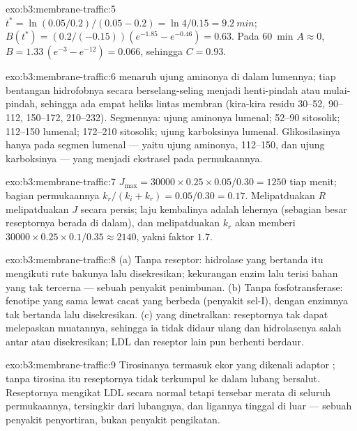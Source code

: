 \begin{solution}{exo:b3:membrane-traffic:5}
$t^{*} = \ln(0.05/0.2)/(0.05 - 0.2) = \ln 4/0.15 = \qty{9.2}{min}$;
$B(t^{*}) = (0.2/(-0.15))(e^{-1.85} - e^{-0.46}) = 0.63$. Pada \qty{60}{min}
$A \approx 0$, $B = 1.33\,(e^{-3} - e^{-12}) = 0.066$, sehingga $C = 0.93$.
\end{solution}

\begin{solution}{exo:b3:membrane-traffic:6}
 menaruh ujung aminonya di dalam lumennya; tiap
bentangan hidrofobnya secara berselang-seling menjadi henti-pindah atau
mulai-pindah, sehingga ada empat heliks lintas membran (kira-kira residu 30--52,
90--112, 150--172, 210--232). Segmennya: ujung aminonya lumenal;
52--90 sitosolik; 112--150 lumenal; 172--210 sitosolik; ujung
karboksinya lumenal. Glikosilasinya hanya pada segmen lumenal --- yaitu
ujung aminonya, 112--150, dan ujung karboksinya --- yang menjadi
ekstrasel pada permukaannya.
\end{solution}

\begin{solution}{exo:b3:membrane-traffic:7}
$J_{\max} = \num{30000}\times 0.25\times 0.05/0.30 = 1250$ tiap menit;
bagian permukaannya $k_{r}/(k_{i} + k_{r}) = 0.05/0.30 = 0.17$. Melipatduakan $R$
melipatduakan $J$ secara persis; laju kembalinya adalah lehernya (sebagian
besar reseptornya berada di dalam), dan melipatduakan $k_{r}$ akan memberi $\num{30000}\times 0.25
\times 0.1/0.35 \approx 2140$, yakni faktor $1.7$.
\end{solution}

\begin{solution}{exo:b3:membrane-traffic:8}
(a) Tanpa reseptor: hidrolase yang bertanda itu mengikuti rute bakunya lalu
disekresikan;  kekurangan enzim lalu terisi bahan yang tak
tercerna --- sebuah penyakit penimbunan. (b) Tanpa fosfotransferase: fenotipe
yang sama lewat cacat yang berbeda (penyakit sel-I), dengan enzimnya
tak bertanda lalu disekresikan. (c)  yang dinetralkan: reseptornya tak
dapat melepaskan muatannya, sehingga ia tidak didaur ulang dan hidrolasenya
salah antar atau disekresikan; LDL dan reseptor lain pun berhenti berdaur.
\end{solution}

\begin{solution}{exo:b3:membrane-traffic:9}
Tirosinanya termasuk  ekor yang dikenali adaptor ;
tanpa tirosina itu reseptornya tidak terkumpul ke dalam lubang bersalut.
Reseptornya mengikat LDL secara normal tetapi tersebar merata di seluruh
permukaannya, tersingkir dari lubangnya, dan ligannya tinggal di luar --- sebuah
penyakit penyortiran, bukan penyakit pengikatan.
\end{solution}

